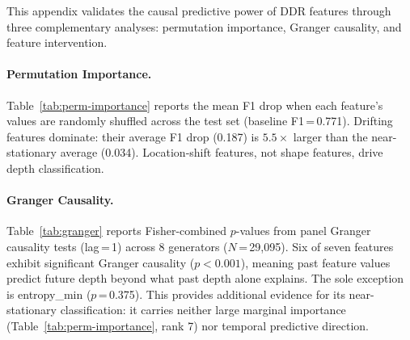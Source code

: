 This appendix validates the causal predictive power of DDR features through three complementary analyses: permutation importance, Granger causality, and feature intervention.

\paragraph{Permutation Importance.}
Table~\ref{tab:perm-importance} reports the mean F1 drop when each feature's values are randomly shuffled across the test set (baseline F1\,=\,0.771).
Drifting features dominate: their average F1 drop (0.187) is $5.5\times$ larger than the near-stationary average (0.034). Location-shift features, not shape features, drive depth classification.

\begin{table}[ht]
\centering
\small
\caption{Permutation importance (8-gen LOGO). Each feature is shuffled independently; the resulting F1 drop quantifies marginal importance. Drifting features average $0.187$ vs.\ near-stationary $0.034$ ($5.5\times$).}
\label{tab:perm-importance}
\end{table}

\paragraph{Granger Causality.}
Table~\ref{tab:granger} reports Fisher-combined $p$-values from panel Granger causality tests (lag\,=\,1) across 8 generators ($N$\,=\,29{,}095).
Six of seven features exhibit significant Granger causality ($p < 0.001$), meaning past feature values predict future depth beyond what past depth alone explains.
The sole exception is entropy\_min ($p$\,=\,0.375). This provides additional evidence for its near-stationary classification: it carries neither large marginal importance (Table~\ref{tab:perm-importance}, rank 7) nor temporal predictive direction.

